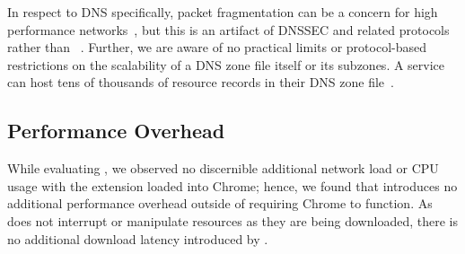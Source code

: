 In respect to DNS specifically, packet fragmentation can be a concern for high
performance networks~\cite{EDNS}, but this is an artifact of DNSSEC and related
protocols rather than \SYSTEM{}~\cite{DNSSEC}. Further, we are aware of no
practical limits or protocol-based restrictions on the scalability of a DNS zone
file itself or its subzones. A service can host tens of thousands of resource
records in their DNS zone file~\cite{DNS1, DNS2}.

\subsection{Performance Overhead}

While evaluating \SYSTEM{}, we observed no discernible additional network load
or CPU usage with the extension loaded into Chrome; hence, we found that
\SYSTEM{} introduces no additional performance overhead outside of requiring
Chrome to function. As \SYSTEM{} does not interrupt or manipulate resources as
they are being downloaded, there is no additional download latency introduced by
\SYSTEM{}.
